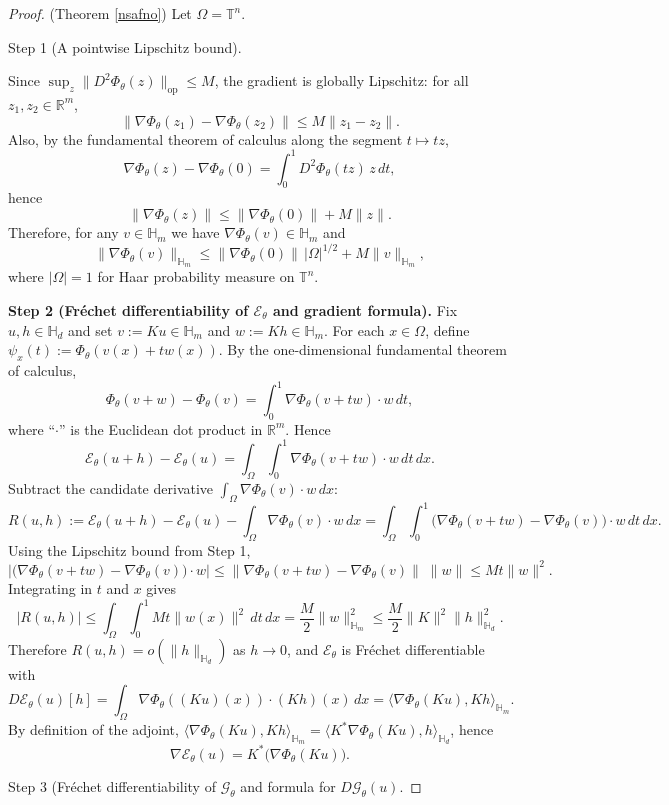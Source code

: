 \documentclass[10pt,a4paper]{amsart}
\newcommand{\Hd}{\mathbb{H}_d}
\newcommand{\Hm}{\mathbb{H}_m}
\newcommand{\inner}[2]{\langle #1, #2 \rangle}
\begin{document}
\begin{proof}(Theorem \ref{nsafno})
Let $\Omega=\mathbb{T}^n$.

Step 1 (A pointwise Lipschitz bound).

Since $\sup_{z}\|D^2\Phi_\theta(z)\|_{\mathrm{op}}\le M$, the gradient is globally Lipschitz:
for all $z_1,z_2\in\mathbb{R}^m$,
\[
\|\nabla\Phi_\theta(z_1)-\nabla\Phi_\theta(z_2)\|
\le M\|z_1-z_2\|.
\]
Also, by the fundamental theorem of calculus along the segment $t\mapsto tz$,
\[
\nabla\Phi_\theta(z)-\nabla\Phi_\theta(0)
=\int_0^1 D^2\Phi_\theta(tz)\,z\,dt,
\]
hence
\[
\|\nabla\Phi_\theta(z)\|\le \|\nabla\Phi_\theta(0)\| + M\|z\|.
\]
Therefore, for any $v\in \Hm$ we have $\nabla\Phi_\theta(v)\in \Hm$ and
\[
\|\nabla\Phi_\theta(v)\|_{\Hm}
\le \|\nabla\Phi_\theta(0)\|\,|\Omega|^{1/2} + M\|v\|_{\Hm},
\]
where $|\Omega|=1$ for Haar probability measure on $\mathbb{T}^n$.

\textbf{Step 2 (Fr\'echet differentiability of $\mathcal{E}_\theta$ and gradient formula).}
Fix $u,h\in\Hd$ and set $v:=Ku\in\Hm$ and $w:=Kh\in\Hm$.
For each $x\in\Omega$, define $\psi_x(t):=\Phi_\theta(v(x)+t w(x))$.
By the one-dimensional fundamental theorem of calculus,
\[
\Phi_\theta(v+w)-\Phi_\theta(v)
=\int_0^1 \nabla\Phi_\theta(v+t w)\cdot w\,dt,
\]
where ``$\cdot$'' is the Euclidean dot product in $\mathbb{R}^m$.
Hence
\[
\mathcal{E}_\theta(u+h)-\mathcal{E}_\theta(u)
=\int_\Omega\int_0^1 \nabla\Phi_\theta(v+t w)\cdot w\,dt\,dx.
\]
Subtract the candidate derivative $\int_\Omega \nabla\Phi_\theta(v)\cdot w\,dx$:
\[
R(u,h)
:=\mathcal{E}_\theta(u+h)-\mathcal{E}_\theta(u)-\int_\Omega \nabla\Phi_\theta(v)\cdot w\,dx
=\int_\Omega\int_0^1\big(\nabla\Phi_\theta(v+t w)-\nabla\Phi_\theta(v)\big)\cdot w\,dt\,dx.
\]
Using the Lipschitz bound from Step 1,
\[
\big|\big(\nabla\Phi_\theta(v+t w)-\nabla\Phi_\theta(v)\big)\cdot w\big|
\le \|\nabla\Phi_\theta(v+t w)-\nabla\Phi_\theta(v)\|\;\|w\|
\le M t \|w\|^2.
\]
Integrating in $t$ and $x$ gives
\[
|R(u,h)|
\le \int_\Omega\int_0^1 M t \|w(x)\|^2\,dt\,dx
=\frac{M}{2}\|w\|_{\Hm}^2
\le \frac{M}{2}\|K\|^2\|h\|_{\Hd}^2.
\]
Therefore $R(u,h)=o(\|h\|_{\Hd})$ as $h\to 0$, and $\mathcal{E}_\theta$ is Fr\'echet differentiable with
\[
D\mathcal{E}_\theta(u)[h]=\int_\Omega \nabla\Phi_\theta((Ku)(x))\cdot (Kh)(x)\,dx
=\inner{\nabla\Phi_\theta(Ku)}{Kh}_{\Hm}.
\]
By definition of the adjoint, $\inner{\nabla\Phi_\theta(Ku)}{Kh}_{\Hm}
=\inner{K^*\nabla\Phi_\theta(Ku)}{h}_{\Hd}$, hence
\[
\nabla\mathcal{E}_\theta(u)=K^*\big(\nabla\Phi_\theta(Ku)\big).
\]

Step 3 (Fr\'echet differentiability of $\mathcal{G}_\theta$ and formula for $D\mathcal{G}_\theta(u)$.


\end{proof}
\end{document}
